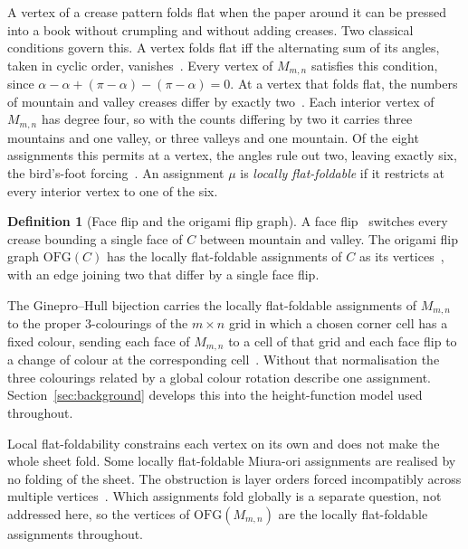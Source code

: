 \documentclass[11pt]{article}
\theoremstyle{definition}
\newtheorem{definition}[theorem]{Definition}
\theoremstyle{remark}
\newcommand{\OFG}{\mathrm{OFG}}
\newcommand{\Mm}{M_{m,n}}
\begin{document}
A vertex of a crease pattern folds flat when the paper around it can be pressed
into a book without crumpling and without adding creases. Two classical
conditions govern this. A vertex folds flat iff the alternating sum of its angles, taken in cyclic
order, vanishes~\cite[Thm.~1]{Hull2003counting}. Every vertex of $\Mm$ satisfies this condition, since
$\alpha-\alpha+(\pi-\alpha)-(\pi-\alpha)=0$. At a vertex that folds flat, the numbers
of mountain and valley creases differ by exactly
two~\cite[Thm.~2]{Hull2003counting}. Each interior vertex of $\Mm$ has degree four, so with the counts differing by two it carries three
mountains and one valley, or three valleys and one mountain. Of the eight
assignments this permits at a vertex, the angles rule out two, leaving exactly
six, the bird's-foot forcing~\cite[\S2]{GineproHull2014counting}. An assignment $\mu$ is
\emph{locally flat-foldable} if it restricts at every interior vertex to one of
the six.

\begin{definition}[Face flip and the origami flip graph]\label{def:ofg}
A face flip~\cite{Akitaya2020faceflips} switches every crease bounding a single
face of $C$ between mountain and valley. The origami flip graph $\OFG(C)$ has
the locally flat-foldable assignments of $C$ as its
vertices~\cite{Hull2022maximal}, with an edge joining two that differ by a single face flip.
\end{definition}

The Ginepro--Hull bijection carries the locally flat-foldable
assignments of
$\Mm$ to the proper $3$-colourings of the $m\times n$ grid in which a chosen
corner cell has a fixed colour, sending each face of $\Mm$ to a cell of that grid
and each face flip to a change of colour at the corresponding
cell~\cite{GineproHull2014counting,Christensen2025origami}. Without that
normalisation the three colourings related by a global colour rotation describe
one assignment. Section~\ref{sec:background} develops this into the
height-function model used throughout.

Local flat-foldability constrains each vertex on its own and does not make the
whole sheet fold. Some locally flat-foldable Miura-ori assignments are realised
by no folding of the sheet. The obstruction is layer orders forced
incompatibly across multiple vertices~\cite[\S5]{GineproHull2014counting}. Which assignments fold globally is
a separate question, not addressed here, so the vertices of $\OFG(\Mm)$ are the
locally flat-foldable assignments throughout.
\end{document}

